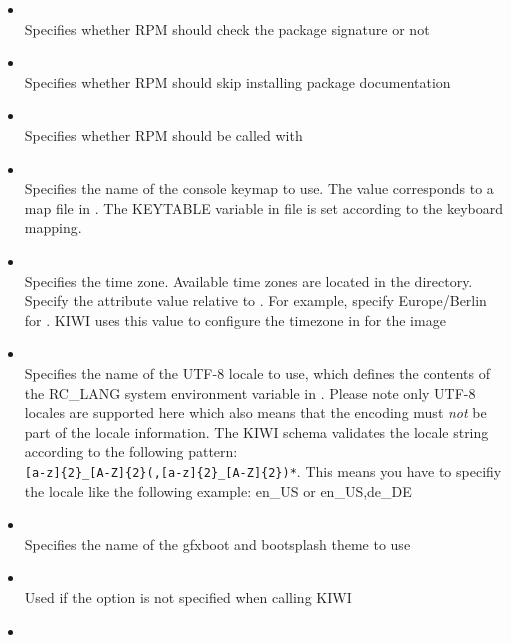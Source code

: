 \begin{itemize}
\item {}\\
      Specifies whether RPM should check the package signature or not
\item {}\\
      Specifies whether RPM should skip installing package documentation
\item {}\\
      Specifies whether RPM should be called with 
\item {}\\
      Specifies the name of the console keymap to use. The value corresponds
      to a map file in . The KEYTABLE variable in
       file is set according to the keyboard
      mapping.
\item {}\\
      Specifies the time zone. Available time zones are located in the
       directory. Specify the attribute value relative to
      . For example, specify Europe/Berlin for
      . KIWI uses this value to configure
      the timezone in  for the image
\item {}\\
      Specifies the name of the UTF-8 locale to use, which defines the
      contents of the RC\_LANG system environment variable in
      . Please note only UTF-8 locales are supported
      here which also means that the encoding must \emph{not} be part of
      the locale information. The KIWI schema validates the locale string
      according to the following pattern:\\
      \verb+[a-z]{2}_[A-Z]{2}(,[a-z]{2}_[A-Z]{2})*+.
      This means you have to specifiy the locale like the following example:
      en\_US or en\_US,de\_DE
\item {}\\
      Specifies the name of the gfxboot and bootsplash theme to use
\item {}\\
      Used if the  option is not specified when calling KIWI
\item {}\\

\end{itemize}
